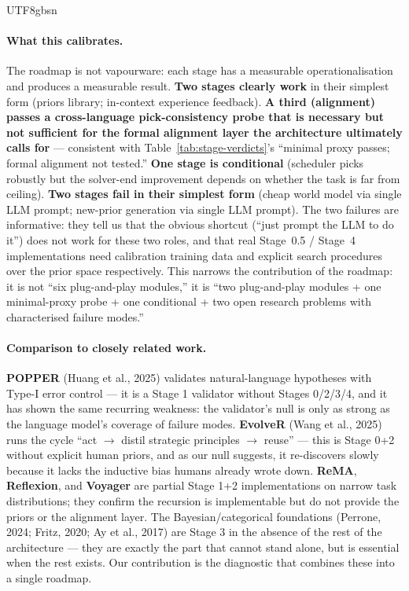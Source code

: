 \documentclass{article}
\begin{document}
\begin{CJK*}{UTF8}{gbsn}
\paragraph{What this calibrates.}
The roadmap is not vapourware: each stage has a measurable
operationalisation and produces a measurable result.
\textbf{Two stages clearly work} in their simplest form (priors
library; in-context experience feedback). \textbf{A third
(alignment) passes a cross-language pick-consistency probe
that is necessary but not sufficient for the formal alignment
layer the architecture ultimately calls for} --- consistent with
Table~\ref{tab:stage-verdicts}'s ``minimal proxy passes; formal
alignment not tested.'' \textbf{One stage is conditional}
(scheduler picks robustly but the solver-end improvement
depends on whether the task is far from ceiling). \textbf{Two
stages fail in their simplest form} (cheap world model via
single LLM prompt; new-prior generation via single LLM prompt).
The two failures are informative: they tell us that the obvious
shortcut (``just prompt the LLM to do it'') does not work for
these two roles, and that real Stage~0.5 / Stage~4
implementations need calibration training data and explicit
search procedures over the prior space respectively. This
narrows the contribution of the roadmap: it is not ``six
plug-and-play modules,'' it is ``two plug-and-play modules +
one minimal-proxy probe + one conditional + two open research
problems with characterised failure modes.''

\paragraph{Comparison to closely related work.}
\textbf{POPPER} (Huang et al., 2025) validates natural-language
hypotheses with Type-I error control --- it is a Stage 1
validator without Stages 0/2/3/4, and it has shown the same
recurring weakness: the validator's null is only as strong as
the language model's coverage of failure modes. \textbf{EvolveR}
(Wang et al., 2025) runs the cycle ``act \(\to\) distil
strategic principles \(\to\) reuse'' --- this is Stage 0+2
without explicit human priors, and as our null suggests, it
re-discovers slowly because it lacks the inductive bias humans
already wrote down. \textbf{ReMA}, \textbf{Reflexion}, and
\textbf{Voyager} are partial Stage 1+2 implementations on narrow
task distributions; they confirm the recursion is implementable
but do not provide the priors or the alignment layer. The
Bayesian/categorical foundations (Perrone, 2024; Fritz, 2020;
Ay et al., 2017) are Stage 3 in the absence of
the rest of the architecture --- they are exactly the part that
cannot stand alone, but is essential when the rest exists. Our
contribution is the diagnostic that combines these into a single
roadmap.


\end{CJK*}
\end{document}
